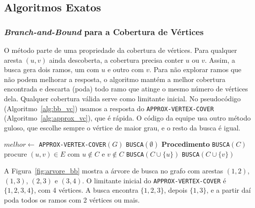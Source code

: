 \documentclass[conference]{IEEEtran}
\theoremstyle{definition}
\theoremstyle{plain}
\begin{document}
\subsection{Algoritmos Exatos}

\subsubsection{\textit{Branch-and-Bound} para a Cobertura de Vértices}

O método parte de uma propriedade da cobertura de vértices. Para qualquer aresta $(u,v)$ ainda descoberta, a cobertura precisa conter $u$ ou $v$. Assim, a busca gera dois ramos, um com $u$ e outro com $v$. Para não explorar ramos que não podem melhorar a resposta, o algoritmo mantém a melhor cobertura encontrada e descarta (poda) todo ramo que atinge o mesmo número de vértices dela. Qualquer cobertura válida serve como limitante inicial. No pseudocódigo (Algoritmo~\ref{alg:bb_vc}) usamos a resposta do \texttt{APPROX-VERTEX-COVER} (Algoritmo~\ref{alg:approx_vc}), que é rápida. O código da equipe usa outro método guloso, que escolhe sempre o vértice de maior grau, e o resto da busca é igual.

\begin{algorithm}[htbp]
\caption{\texttt{BB-VERTEX-COVER}$(G)$}
\label{alg:bb_vc}
$melhor \leftarrow$ \texttt{APPROX-VERTEX-COVER}$(G)$\;
\texttt{BUSCA}$(\emptyset)$\;
\;
\BlankLine
\textbf{Procedimento} \texttt{BUSCA}$(C)$\;
procure $(u, v) \in E$ com $u \notin C$ e $v \notin C$\;
\texttt{BUSCA}$(C \cup \{u\})$ 
\texttt{BUSCA}$(C \cup \{v\})$ 
\end{algorithm}

A Figura~\ref{fig:arvore_bb} mostra a árvore de busca no grafo com arestas $(1,2)$, $(1,3)$, $(2,3)$ e $(3,4)$. O limitante inicial do \texttt{APPROX-VERTEX-COVER} é $\{1,2,3,4\}$, com 4 vértices. A busca encontra $\{1,2,3\}$, depois $\{1,3\}$, e a partir daí poda todos os ramos com 2 vértices ou mais.
\end{document}
